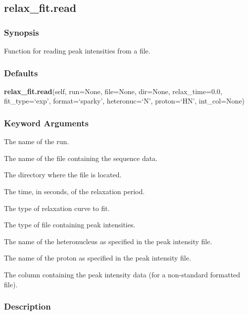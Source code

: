 \newpage

\subsection{relax\_fit.read}


\subsubsection{Synopsis}

Function for reading peak intensities from a file.



\subsubsection{Defaults}

\textsf{\textbf{relax\_fit.read}(self, run=None, file=None, dir=None, relax\_time=0.0, fit\_type=`exp', format=`sparky', heteronuc=`N', proton=`HN', int\_col=None)}


\subsubsection{Keyword Arguments}

  The name of the run. 

  The name of the file containing the sequence data. 

  The directory where the file is located. 

  The time, in seconds, of the relaxation period. 

  The type of relaxation curve to fit. 

  The type of file containing peak intensities. 

  The name of the heteronucleus as specified in the peak intensity file. 

  The name of the proton as specified in the peak intensity file. 

  The column containing the peak intensity data (for a non-standard formatted file). 




\subsubsection{Description}

